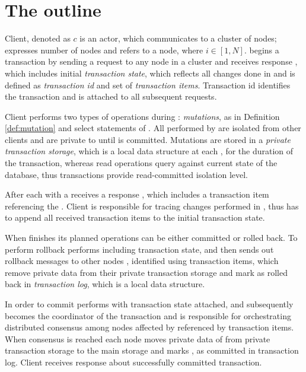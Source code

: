 
\section{The outline}
Client, denoted as $c$ is an actor, which communicates to a cluster of nodes; \nodes expresses number of nodes and  refers to a node, where $i \in [1,N]$. \client begins a transaction \transaction by sending a request to any node in a cluster  and receives response , which includes 
initial \emph{transaction state}, which reflects all changes done in \transaction and is defined as \emph{transaction id} and set of \emph{transaction items}. Transaction id identifies the transaction and is attached to all subsequent requests. 


Client \client performs two types of operations during \transaction: \emph{mutations}, as in Definition \ref{def:mutation} and select statements of \kv. All   performed by \client are isolated from other clients and are private to \transaction until \transaction is committed. Mutations are stored in a \emph{private transaction storage}, which is a local data structure at each , for the duration of the transaction, whereas read operations query against current state of the database, thus transactions provide read-committed isolation level.

After each  with a  \client receives a response , which includes a transaction item referencing the . Client is responsible for tracing changes performed in \transaction, thus \client has to append all received transaction items to the initial transaction state.

When \client finishes its planned operations \transaction can be either committed or rolled back. To perform rollback \client performs  including transaction state, and then  sends out rollback messages to other nodes , identified using transaction items, which remove private data from their private transaction storage and mark \transaction as rolled back in \emph{transaction log}, which is a local data structure.

In order to commit \transaction \client performs  with transaction state attached, and subsequently  becomes the coordinator of the transaction and is responsible for orchestrating distributed consensus among nodes affected by \transaction referenced by transaction items. When consensus is reached each node moves private data of \transaction from private transaction storage to the main storage and marks \transaction, as committed in transaction log. Client receives response  about successfully committed transaction.

